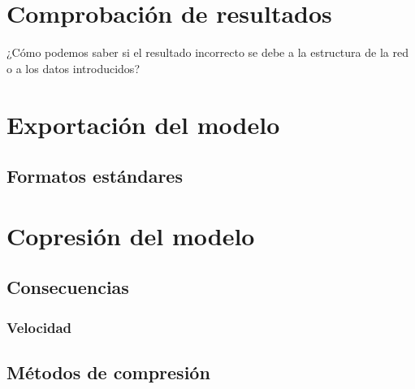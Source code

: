 \section{Comprobación de resultados}

¿Cómo podemos saber si el resultado incorrecto se debe a la estructura de la red o a los datos introducidos?


\section{Exportación del modelo}

\subsection{Formatos estándares}

\subsubsection{}


\section{Copresión del modelo}

\subsection{Consecuencias}

\subsubsection{Velocidad}

\subsubsection{}

\subsection{Métodos de compresión}

\subsubsection{}


